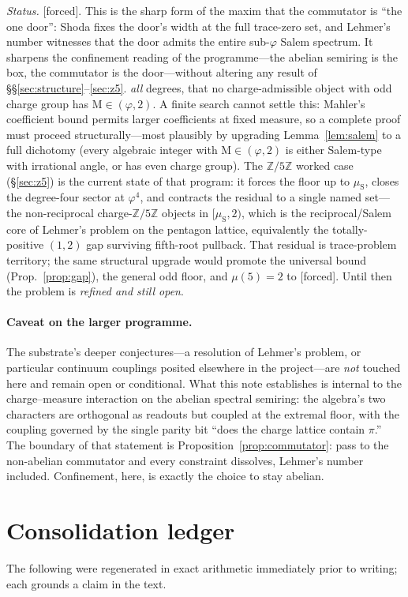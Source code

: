 \documentclass[11pt]{article}
\theoremstyle{definition}
\theoremstyle{remark}
\newcommand{\Mah}{\mathrm{M}}
\newcommand{\Z}{\mathbb{Z}}
\newcommand{\gold}{\varphi}
\newcommand{\Zmod}[1]{\Z/#1\Z}
\newcommand{\status}[1]{{\small\textsf{[#1]}}}
\newcommand{\forced}{\status{forced}}
\newcommand{\muS}{\mu_{\mathrm{S}}}
\begin{document}
\noindent\emph{Status.} \forced{}. This is the sharp form of the maxim that the commutator is
``the one door'': Shoda fixes the door's width at the full trace-zero set, and Lehmer's number
witnesses that the door admits the entire sub-$\gold$ Salem spectrum. It sharpens the
confinement reading of the programme---the abelian semiring is the box, the commutator is the
door---without altering any result of \S\S\ref{sec:structure}--\ref{sec:z5}.
\emph{all} degrees, that no charge-admissible object with odd charge group has
$\Mah\in(\gold,2)$. A finite search cannot settle this: Mahler's coefficient bound permits
larger coefficients at fixed measure, so a complete proof must proceed structurally---most
plausibly by upgrading Lemma~\ref{lem:salem} to a full dichotomy (every algebraic integer with
$\Mah\in(\gold,2)$ is either Salem-type with irrational angle, or has even charge group). The
$\Zmod5$ worked case (\S\ref{sec:z5}) is the current state of that program: it forces the floor
up to $\muS$, closes the degree-four sector at $\gold^{4}$, and contracts the residual to a
single named set---the non-reciprocal charge-$\Zmod5$ objects in $[\muS,2)$, which is the
reciprocal/Salem core of Lehmer's problem on the pentagon lattice, equivalently the
totally-positive $(1,2)$ gap surviving fifth-root pullback. That residual is trace-problem
territory; the same structural upgrade would promote the universal bound (Prop.~\ref{prop:gap}),
the general odd floor, and $\mu(5)=2$ to \forced{}. Until then the problem is \emph{refined and
still open}.

\paragraph{Caveat on the larger programme.} The substrate's deeper conjectures---a resolution
of Lehmer's problem, or particular continuum couplings posited elsewhere in the
project---are \emph{not} touched here and remain open or conditional. What this note
establishes is internal to the charge--measure interaction on the abelian spectral semiring:
the algebra's two characters are orthogonal as readouts but coupled at the extremal floor, with
the coupling governed by the single parity bit ``does the charge lattice contain $\pi$.'' The
boundary of that statement is Proposition~\ref{prop:commutator}: pass to the non-abelian
commutator and every constraint dissolves, Lehmer's number included. Confinement, here, is
exactly the choice to stay abelian.

\appendix
\section{Consolidation ledger}\label{app:ledger}
The following were regenerated in exact arithmetic immediately prior to writing; each grounds
a claim in the text.
\end{document}
